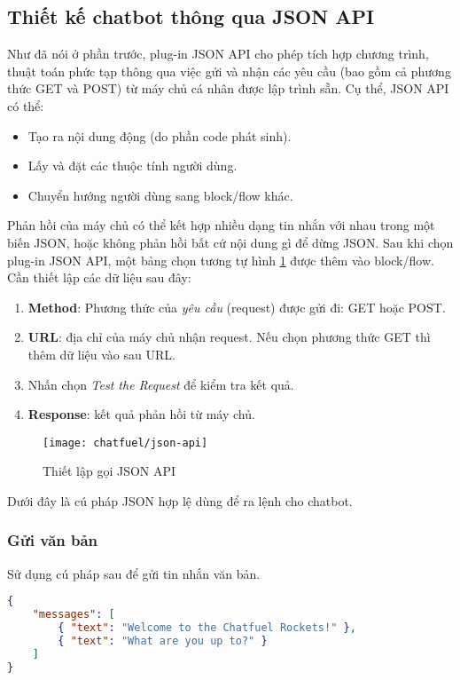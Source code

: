 \subsection{Thiết kế chatbot thông qua JSON API}
Như đã nói ở phần trước, plug-in JSON API cho phép tích hợp chương trình, thuật toán phức tạp thông qua việc gửi và nhận các yêu cầu (bao gồm cả phương thức GET và POST) từ máy chủ cá nhân được lập trình sẵn. Cụ thể, JSON API có thể:\begin{itemize}
	\item Tạo ra nội dung động (do phần code phát sinh).
	\item Lấy và đặt các thuộc tính người dùng.
	\item Chuyển hướng người dùng sang block/flow khác.
\end{itemize}\par
Phản hồi của máy chủ có thể kết hợp nhiều dạng tin nhắn với nhau trong một biến JSON, hoặc không phản hồi bất cứ nội dung gì để dừng JSON. Sau khi chọn plug-in JSON API, một bảng chọn tương tự hình \ref{fig:fig-c3-json-api} được thêm vào block/flow. Cần thiết lập các dữ liệu sau đây: \begin{enumerate}[label=\textbf{(\arabic*)},align=left,left=0cm..0cm,itemindent=*]
	\item \textbf{Method}: Phương thức của \textit{yêu cầu} (request) được gửi đi: GET hoặc POST.
	\item \textbf{URL}: địa chỉ của máy chủ nhận request. Nếu chọn phương thức GET thì thêm dữ liệu vào sau URL.
	\item Nhấn chọn \textit{Test the Request} để kiểm tra kết quả.
	\item \textbf{Response}: kết quả phản hồi từ máy chủ.
\end{enumerate}\par

\begin{figure}[htb!]\centering
	\texttt{[image: chatfuel/json-api]}
	\caption{Thiết lập gọi JSON API}
	\label{fig:fig-c3-json-api}
\end{figure}\par

Dưới đây là cú pháp JSON hợp lệ dùng để ra lệnh cho chatbot.
\subsubsection{Gửi văn bản}
Sử dụng cú pháp sau để gửi tin nhắn văn bản.
\begin{lstlisting}[language=json]
{
	"messages": [
		{ "text": "Welcome to the Chatfuel Rockets!" },
		{ "text": "What are you up to?" }
	]
}
\end{lstlisting}\par

